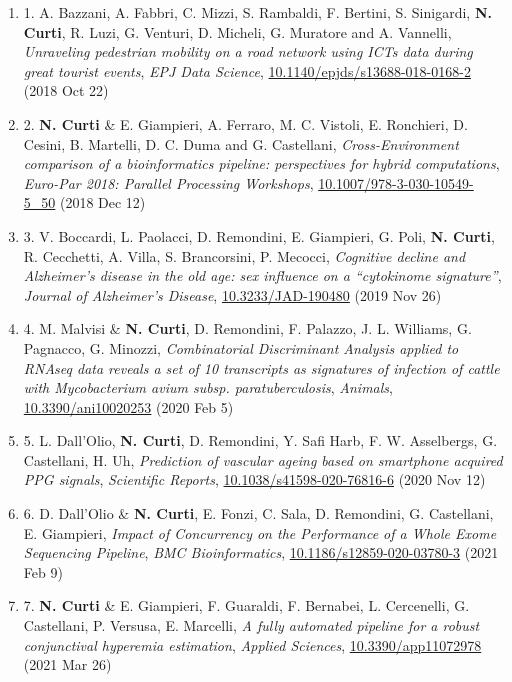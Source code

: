 \documentclass[a4paper,11pt]{article}
\newcommand{\quotes}[1]{``#1''}
\newcommand{\enumicon}[2]{\item[{\texttt{[image: \#2]}}]}
\begin{document}
\begin{enumerate}

  \enumicon{0.05}{article.png}1. A. Bazzani, A. Fabbri, C. Mizzi, S. Rambaldi, F. Bertini, S. Sinigardi, \textbf{N. Curti}, R. Luzi, G. Venturi, D. Micheli, G. Muratore and A. Vannelli, \emph{Unraveling pedestrian mobility on a road network using ICTs data during great tourist events}, \emph{EPJ Data Science}, \url{10.1140/epjds/s13688-018-0168-2} (2018 Oct 22)

  \enumicon{0.05}{article.png}2. \textbf{N. Curti} \& E. Giampieri, A. Ferraro, M. C. Vistoli, E. Ronchieri, D. Cesini, B. Martelli, D. C. Duma and G. Castellani, \emph{Cross-Environment comparison of a bioinformatics pipeline: perspectives for hybrid computations}, \emph{Euro-Par 2018: Parallel Processing Workshops}, \url{10.1007/978-3-030-10549-5_50} (2018 Dec 12)

  \enumicon{0.05}{article.png}3. V. Boccardi, L. Paolacci, D. Remondini, E. Giampieri, G. Poli, \textbf{N. Curti}, R. Cecchetti, A. Villa, S. Brancorsini, P. Mecocci, \emph{Cognitive decline and Alzheimer's disease in the old age: sex influence on a \quotes{cytokinome signature}}, \emph{Journal of Alzheimer's Disease}, \url{10.3233/JAD-190480} (2019 Nov 26)

  \enumicon{0.05}{article.png}4. M. Malvisi \& \textbf{N. Curti}, D. Remondini, F. Palazzo, J. L. Williams, G. Pagnacco, G. Minozzi, \emph{Combinatorial Discriminant Analysis applied to RNAseq data reveals a set of 10 transcripts as signatures of infection of cattle with Mycobacterium avium subsp. paratuberculosis}, \emph{Animals}, \url{10.3390/ani10020253} (2020 Feb 5)

  \enumicon{0.05}{article.png}5. L. Dall'Olio, \textbf{N. Curti}, D. Remondini, Y. Safi Harb, F. W. Asselbergs, G. Castellani, H. Uh, \emph{Prediction of vascular ageing based on smartphone acquired PPG signals}, \emph{Scientific Reports}, \url{10.1038/s41598-020-76816-6} (2020 Nov 12)

  \enumicon{0.05}{article.png}6. D. Dall'Olio \& \textbf{N. Curti}, E. Fonzi, C. Sala, D. Remondini, G. Castellani, E. Giampieri, \emph{Impact of Concurrency on the Performance of a Whole Exome Sequencing Pipeline}, \emph{BMC Bioinformatics}, \url{10.1186/s12859-020-03780-3} (2021 Feb 9)

  \enumicon{0.05}{article.png}7. \textbf{N. Curti} \& E. Giampieri, F. Guaraldi, F. Bernabei, L. Cercenelli, G. Castellani, P. Versusa, E. Marcelli, \emph{A fully automated pipeline for a robust conjunctival hyperemia estimation}, \emph{Applied Sciences}, \url{10.3390/app11072978} (2021 Mar 26)


\end{enumerate}
\end{document}
